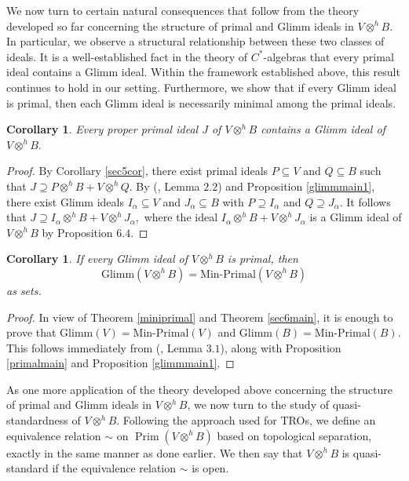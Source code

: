 \documentclass{birkjour}
\newtheorem{cor}[thm]{Corollary}
\theoremstyle{definition}
\theoremstyle{remark}
\numberwithin{equation}{section}
\begin{document}
We now turn to certain natural consequences that follow from the theory developed so far concerning the structure of primal and Glimm ideals in \( V \otimes^h B \). In particular, we observe a structural relationship between these two classes of ideals. It is a well-established fact in the theory of \( C^* \)-algebras that every primal ideal contains a Glimm ideal. Within the framework established above, this result continues to hold in our setting. Furthermore, we show that if every Glimm ideal is primal, then each Glimm ideal is necessarily minimal among the primal ideals. 

\begin{cor}
Every proper primal ideal $J$ of \( V \otimes^h B \) contains a Glimm ideal of $V \otimes^h B.$
\end{cor}

\begin{proof}
    By Corollary \ref{sec5cor}, there exist primal ideals \( P \subseteq V \) and \( Q \subseteq B \) such that $ J \supseteq P \otimes^h B + V \otimes^h Q$. By (\cite{qs1991}, Lemma $2.2$) and Proposition \ref{glimmmain1},   there exist Glimm ideals \( I_\alpha \subseteq V \) and \( J_\alpha \subseteq B \) with \( P \supseteq I_\alpha \) and \( Q \supseteq J_\alpha \). It follows that $J \supseteq I_\alpha \otimes^h B + V \otimes^h J_\alpha,$ where the ideal \( I_\alpha \otimes^h B + V \otimes^h J_\alpha \) is a Glimm ideal of \( V \otimes^h B \) by Proposition $6.4$.


\end{proof}

 

\begin{cor}
 If every Glimm ideal of $V \otimes^h B$ is primal, then $$\mathrm{Glimm}(V \otimes^h B) = \mathrm{Min}\text{-}\mathrm{Primal}(V \otimes^h B)$$
as sets.
\end{cor}

\begin{proof}
    In view of Theorem \ref{miniprimal} and Theorem \ref{sec6main}, it is enough to prove that $\mathrm{Glimm}(V) = \mathrm{Min}\text{-}\mathrm{Primal}(V)$ and $\mathrm{Glimm}(B) = \mathrm{Min}\text{-}\mathrm{Primal}(B)$. This follows immediately from  (\cite{qs1991}, Lemma $3.1$), along with Proposition \ref{primalmain} and Proposition \ref{glimmmain1}. 
\end{proof}


As one more application of the theory developed above concerning the structure of primal and Glimm ideals in $V \otimes^h B$, we now turn to the study of quasi-standardness of $V \otimes^h B$. Following the approach used for TROs, we define an equivalence relation \(\sim\) on $\operatorname{Prim}(V \otimes^h B)$ based on topological separation, exactly in the same manner as done earlier. We then say that $V \otimes^h B$ is quasi-standard if the equivalence relation \(\sim\) is open.
\end{document}
